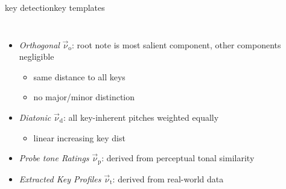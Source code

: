         \begin{frame}{key detection}{key templates}
            \vspace{-5mm}
            \begin{columns}
                    \begin{itemize}
                        \item	\emph{Orthogonal} $\vec{\nu}_\mathrm{o}$: root note is most salient component, other components negligible
                                \pause
                                \begin{itemize}
                                    \item	same distance to all keys
                                    \item	no major/minor distinction 
                                \end{itemize}
                        \item<3->	\emph{Diatonic} $\vec{\nu}_\mathrm{d}$: all key-inherent pitches weighted equally
                                \pause
                                \begin{itemize}
                                    \item	linear increasing key dist
                                \end{itemize}
                        \item<4->	\emph{Probe tone Ratings}  $\vec{\nu}_\mathrm{p}$: derived from perceptual tonal similarity
                        \item<5->	\emph{Extracted Key Profiles} $\vec{\nu}_\mathrm{t}$: derived from real-world data
                    \end{itemize}
                \vspace{-5mm}
                \vspace{20mm}
            \end{columns}
        \end{frame}
